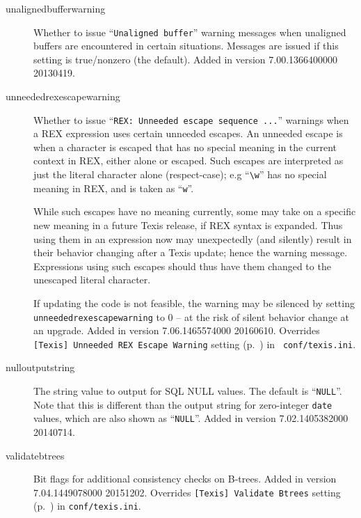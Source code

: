 \begin{description}
\item[unalignedbufferwarning]

  Whether to issue ``{\tt Unaligned buffer}'' warning messages when
  unaligned buffers are encountered in certain situations.  Messages
  are issued if this setting is true/nonzero (the default).  Added in
  version 7.00.1366400000 20130419.

\item[unneededrexescapewarning]
\label{UnneededRexEscapeWarningSqlProperty}

  Whether to issue ``{\tt REX: Unneeded escape sequence ...}''
  warnings when a REX expression uses certain unneeded escapes.  An
  unneeded escape is when a character is escaped that has no special
  meaning in the current context in REX, either alone or escaped.
  Such escapes are interpreted as just the literal character alone
  (respect-case); e.g ``\verb`\w`'' has no special meaning in REX, and
  is taken as ``\verb`w`''.

  While such escapes have no meaning currently, some may take on a
  specific new meaning in a future Texis release, if REX syntax is
  expanded.  Thus using them in an expression now may unexpectedly
  (and silently) result in their behavior changing after a Texis
  update; hence the warning message.  Expressions using such escapes
  should thus have them changed to the unescaped literal character.

  If updating the code is not feasible, the warning may be silenced by
  setting \verb`unneededrexescapewarning` to 0 -- at the risk of
  silent behavior change at an upgrade.  Added in version
  7.06.1465574000 20160610.  Overrides {\tt [Texis] Unneeded REX
    Escape Warning} setting
  (p.~\pageref{TexisIniUnneededREXEscapeWarning}) in {\tt
    conf/texis.ini}.

\item[nulloutputstring]

  The string value to output for SQL NULL values.  The default
  is ``\verb`NULL`''.  Note that this is different than the output
  string for zero-integer \verb`date` values, which are also shown
  as ``\verb`NULL`''.  Added in version 7.02.1405382000 20140714.

\item[validatebtrees]

  Bit flags for additional consistency checks on B-trees.  Added in
  version 7.04.1449078000 20151202.  Overrides
  {\tt [Texis] Validate Btrees} setting
  (p.~\pageref{TexisIniTexisValidateBtrees}) in \verb`conf/texis.ini`.

\end{description}
